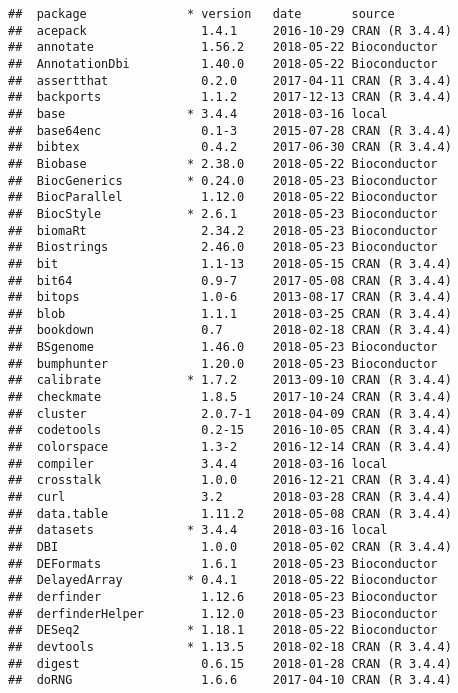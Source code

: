 \documentclass[]{article}
\begin{document}
\begin{verbatim}
##  package              * version   date       source        
##  acepack                1.4.1     2016-10-29 CRAN (R 3.4.4)
##  annotate               1.56.2    2018-05-22 Bioconductor  
##  AnnotationDbi          1.40.0    2018-05-22 Bioconductor  
##  assertthat             0.2.0     2017-04-11 CRAN (R 3.4.4)
##  backports              1.1.2     2017-12-13 CRAN (R 3.4.4)
##  base                 * 3.4.4     2018-03-16 local         
##  base64enc              0.1-3     2015-07-28 CRAN (R 3.4.4)
##  bibtex                 0.4.2     2017-06-30 CRAN (R 3.4.4)
##  Biobase              * 2.38.0    2018-05-22 Bioconductor  
##  BiocGenerics         * 0.24.0    2018-05-23 Bioconductor  
##  BiocParallel           1.12.0    2018-05-22 Bioconductor  
##  BiocStyle            * 2.6.1     2018-05-23 Bioconductor  
##  biomaRt                2.34.2    2018-05-23 Bioconductor  
##  Biostrings             2.46.0    2018-05-23 Bioconductor  
##  bit                    1.1-13    2018-05-15 CRAN (R 3.4.4)
##  bit64                  0.9-7     2017-05-08 CRAN (R 3.4.4)
##  bitops                 1.0-6     2013-08-17 CRAN (R 3.4.4)
##  blob                   1.1.1     2018-03-25 CRAN (R 3.4.4)
##  bookdown               0.7       2018-02-18 CRAN (R 3.4.4)
##  BSgenome               1.46.0    2018-05-23 Bioconductor  
##  bumphunter             1.20.0    2018-05-23 Bioconductor  
##  calibrate            * 1.7.2     2013-09-10 CRAN (R 3.4.4)
##  checkmate              1.8.5     2017-10-24 CRAN (R 3.4.4)
##  cluster                2.0.7-1   2018-04-09 CRAN (R 3.4.4)
##  codetools              0.2-15    2016-10-05 CRAN (R 3.4.4)
##  colorspace             1.3-2     2016-12-14 CRAN (R 3.4.4)
##  compiler               3.4.4     2018-03-16 local         
##  crosstalk              1.0.0     2016-12-21 CRAN (R 3.4.4)
##  curl                   3.2       2018-03-28 CRAN (R 3.4.4)
##  data.table             1.11.2    2018-05-08 CRAN (R 3.4.4)
##  datasets             * 3.4.4     2018-03-16 local         
##  DBI                    1.0.0     2018-05-02 CRAN (R 3.4.4)
##  DEFormats              1.6.1     2018-05-23 Bioconductor  
##  DelayedArray         * 0.4.1     2018-05-22 Bioconductor  
##  derfinder              1.12.6    2018-05-23 Bioconductor  
##  derfinderHelper        1.12.0    2018-05-23 Bioconductor  
##  DESeq2               * 1.18.1    2018-05-22 Bioconductor  
##  devtools             * 1.13.5    2018-02-18 CRAN (R 3.4.4)
##  digest                 0.6.15    2018-01-28 CRAN (R 3.4.4)
##  doRNG                  1.6.6     2017-04-10 CRAN (R 3.4.4)

\end{verbatim}
\end{document}
